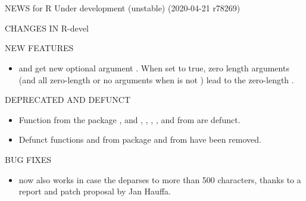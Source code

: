 \documentclass[letterpaper]{book}
\begin{document}
\chapter*{}\sloppy
\begin{center}
\huge
NEWS for R Under development (unstable) (2020-04-21 r78269)
\end{center}
%
\begin{Section}{ CHANGES IN R-devel}

%
\begin{SubSection}{NEW FEATURES}
\begin{itemize}

\item{}  and  get new optional argument
.  When set to true, zero length arguments
(and all zero-length or no arguments when  is not
) lead to the zero-length .

\end{itemize}


\end{SubSection}


%
\begin{SubSection}{DEPRECATED AND DEFUNCT}
\begin{itemize}

\item{} Function  from the package , and
, ,
, , and
 from  are defunct.

\item{} Defunct functions  and  from
package  and  from  have
been removed.

\end{itemize}


\end{SubSection}


%
\begin{SubSection}{BUG FIXES}
\begin{itemize}

\item{}  now also works in case the 
deparses to more than 500 characters, thanks to a report and patch
proposal by Jan Hauffa.

\end{itemize}


\end{SubSection}

\end{Section}
\end{document}
